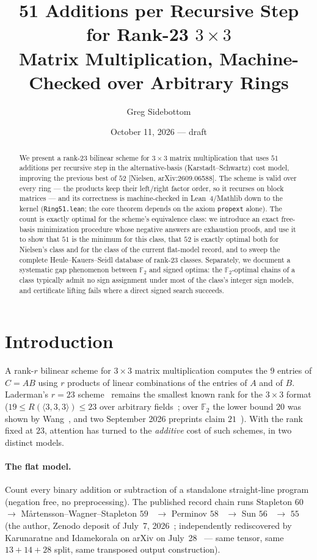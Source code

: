 \documentclass[11pt]{article}
\title{51 Additions per Recursive Step for Rank-23 $3\times3$\\
Matrix Multiplication, Machine-Checked over Arbitrary Rings}
\author{Greg Sidebottom}
\date{October 11, 2026 --- draft}
\theoremstyle{definition}
\theoremstyle{remark}
\newcommand{\F}{\mathbb{F}}
\begin{document}
\maketitle

\begin{abstract}
We present a rank-23 bilinear scheme for $3\times3$ matrix
multiplication that uses $51$ additions per recursive step in the
alternative-basis (Karstadt--Schwartz) cost model, improving the
previous best of $52$ [Nielsen, arXiv:2609.06588].  The scheme is
valid over every ring --- the products keep their left/right factor
order, so it recurses on block matrices --- and its correctness is
machine-checked in Lean~4/Mathlib down to the kernel
(\texttt{Ring51.lean}; the core theorem depends on the axiom
\texttt{propext} alone).  The count is exactly optimal for the
scheme's equivalence class: we introduce an exact free-basis
minimization procedure whose negative answers are exhaustion proofs,
and use it to show that $51$ is the minimum for this class, that $52$
is exactly optimal both for Nielsen's class and for the class of the
current flat-model record, and to sweep the complete Heule--Kauers--Seidl
database of rank-23 classes.  Separately, we document a systematic gap
phenomenon between $\F_2$ and signed optima: the $\F_2$-optimal chains
of a class typically admit no sign assignment under most of the
class's integer sign models, and certificate lifting fails where a
direct signed search succeeds.
\end{abstract}

\section{Introduction}\label{sec:intro}

A rank-$r$ bilinear scheme for $3\times3$ matrix multiplication
computes the $9$ entries of $C=AB$ using $r$ products of linear
combinations of the entries of $A$ and of $B$.  Laderman's $r=23$
scheme~\cite{Laderman76} remains the smallest known rank for the
$3\times3$ format ($19\le R(\langle3,3,3\rangle)\le23$ over
arbitrary fields~\cite{Blaser03}; over $\F_2$ the lower bound $20$ was
shown by Wang~\cite{Wang26}, and two September 2026 preprints claim
$21$~\cite{Wang26b,Qiushi26}).  With the rank fixed at $23$, attention
has turned to the \emph{additive} cost of such schemes, in two
distinct models.

\paragraph{The flat model.}  Count every binary addition or
subtraction of a standalone straight-line program (negation free, no
preprocessing).  The published record chain runs
Stapleton $60$~\cite{Stapleton25} $\to$
M{\aa}rtensson--Wagner--Stapleton $59$~\cite{MWS26} $\to$
Perminov $58$~\cite{Perminov25} $\to$ Sun $56$~\cite{Sun26} $\to$
$55$ (the author, Zenodo deposit of July~7,
2026~\cite{Sidebottom26}; independently rediscovered by Karunaratne
and Idamekorala on arXiv on July~28~\cite{KI26} --- same tensor, same
$13{+}14{+}28$ split, same transposed output construction).
\end{document}
